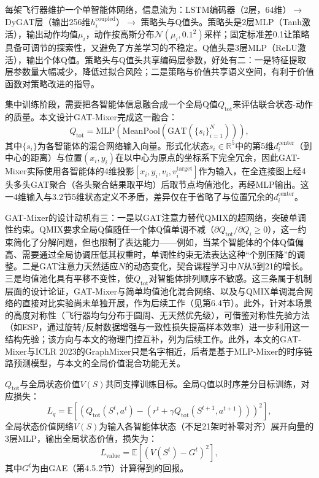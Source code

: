 \documentclass[12pt,a4paper,UTF8]{ctexart}
\begin{document}
每架飞行器维护一个单智能体网络，信息流为：LSTM编码器（2层，64维）$\to$ DyGAT层（输出256维$h_i^{\text{coupled}}$）$\to$ 策略头与Q值头。策略头是2层MLP（Tanh激活），输出动作均值$\mu_i$，动作按高斯分布$\mathcal{N}(\mu_i, 0.1^2)$采样；固定标准差0.1让策略具备可调节的探索性，又避免了方差学习的不稳定。Q值头是3层MLP（ReLU激活），输出个体Q值。策略头与Q值头共享编码层参数，好处有二：一是特征提取层参数量大幅减少，降低过拟合风险；二是策略与价值共享语义空间，有利于价值函数对策略改进的指导。

集中训练阶段，需要把各智能体信息融合成一个全局Q值$Q_{\text{tot}}$来评估联合状态-动作的质量。本文设计GAT-Mixer完成这一融合：
\begin{equation}
    Q_{\text{tot}} = \text{MLP}\!\left(\text{MeanPool}\!\left(\text{GAT}\left(\{s_i\}_{i=1}^{N}\right)\right)\right),
    \label{eq:gat_mixer}
\end{equation}
其中$\{s_i\}$为各智能体的混合网络输入向量。形式化状态$s_i\in\mathbb{R}^5$中的第5维$d_i^{\text{center}}$（到中心的距离）与位置$(x_i,y_i)$在以中心为原点的坐标系下完全冗余，因此GAT-Mixer实际使用各智能体的4维投影$[x_i,y_i,v_i,v_i^{\text{target}}]$作为输入，在全连接图上经4头多头GAT聚合（各头聚合结果取平均）后取节点均值池化，再经MLP输出。这一4维输入与3.2节5维状态定义不矛盾，差异仅在于省略了与位置冗余的$d_i^{\text{center}}$。

GAT-Mixer的设计动机有三：一是以GAT注意力替代QMIX的超网络，突破单调性约束。QMIX要求全局Q值随任一个体Q值单调不减（$\partial Q_{\text{tot}}/\partial Q_i\geq0$），这一约束简化了分解问题，但也限制了表达能力——例如，当某个智能体的个体Q值偏高、需要通过全局协调压低其权重时，单调性约束无法表达这种“个别压降”的调整。二是GAT注意力天然适应$N$的动态变化，契合课程学习中$N$从5到21的增长。三是均值池化具有平移不变性，使$Q_{\text{tot}}$对智能体排列顺序不敏感。这三条属于机制层面的设计论证，GAT-Mixer与简单均值池化混合网络、以及与QMIX单调混合网络的直接对比实验尚未单独开展，作为后续工作（见第6.4节）。此外，针对本场景的高度对称性（飞行器均匀分布于圆周、无天然优先级），可借鉴对称性先验方法（如ESP\cite{ref57}，通过旋转/反射数据增强与一致性损失提高样本效率）进一步利用这一结构先验；该方向与本文的物理门控互补，列为后续工作。此外，本文的GAT-Mixer与ICLR 2023的GraphMixer\cite{ref28}只是名字相近，后者是基于MLP-Mixer的时序链路预测模型，与本文的全局价值混合功能无关。

$Q_{\text{tot}}$与全局状态价值$V(S)$共同支撑训练目标。全局Q值以时序差分目标训练，对应损失：
\begin{equation}
    L_{q} = \mathbb{E}\left[\left(Q_{\text{tot}}(S^t,a^t) - \left(r^t + \gamma Q_{\text{tot}}(S^{t+1},a^{t+1})\right)\right)^2\right],
    \label{eq:loss_q}
\end{equation}
全局状态价值网络$V(S)$为输入各智能体状态（不足21架时补零对齐）展开向量的3层MLP，输出全局状态价值，损失为：
\begin{equation}
    L_{\text{value}} = \mathbb{E}\left[\left(V(S^t) - G^t\right)^2\right],
    \label{eq:loss_value}
\end{equation}
其中$G^t$为由GAE（第4.5.2节）计算得到的回报。
\end{document}
